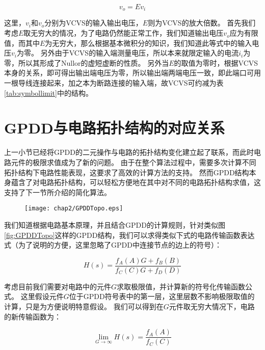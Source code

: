 \begin{equation}
v_o = E v_i
\end{equation}

这里，$v_i$和$v_o$分别为VCVS的输入输出电压，$E$则为VCVS的放大倍数。
首先我们考虑$E$取无穷大的情况，为了电路仍然能正常工作，我们知道输出电压$v_o$应为有限值，而其中$E$为无穷大，那么根据基本微积分的知识，我们知道此等式中的输入电压$v_i$为零。
另外由于VCVS的输入端测量电压，所以本来就限定输入的电流$i_i$为零，所以其形成了Nullor的虚短虚断的性质。
另外当$E$的取值为零时，根据VCVS本身的关系，即可得出输出端电压为零，所以输出端两端电压一致，即此端口可用一根导线连接起来，加之本为断路连接的输入端，故VCVS可约减为表\ref{tab:symbollimit}中的结构。

\section{GPDD与电路拓扑结构的对应关系}

上一小节已经将GPDD的二元操作与电路的拓扑结构变化建立起了联系，而此时电路元件的极限求值成为了新的问题。
由于在整个算法过程中，需要多次计算不同拓扑结构下电路性能表现，这要求了高效的计算方法的支持。
然而GPDD结构本身蕴含了对电路拓扑结构，可以轻松方便地在其中对不同的电路拓扑结构求值，这支持了下一节所介绍的简化算法。

\begin{figure}[!htp]
	\centering
	\texttt{[image: chap2/GPDDTopo.eps]}
\end{figure}

我们知道根据电路基本原理，并且结合GPDD的计算规则，针对类似图\ref{fig:GPDDTopo}这样的GPDD结构，我们可以求得类似下式的电路传输函数表达式（为了说明的方便，这里忽略了GPDD中连接节点的边上的符号）：

\begin{equation}
H \left( s \right) = \frac{{{f_A}\left( A \right)G + {f_B}\left( B \right)}}{{{f_C}\left( C \right)G + {f_D}\left( D \right)}}
\end{equation}

考虑目前我们需要对电路中的元件$G$求取极限值，并计算新的符号化传输函数公式。
这里假设元件$G$位于GPDD符号表中的第一层，这里层数不影响极限取值的计算，只是为方便说明特意假设。
我们可以得到在$G$元件取无穷大情况下，电路的新传输函数为：

\begin{equation}
\label{eq:simpGPDD}
\mathop {\lim }\limits_{G \to \infty } H \left( s \right) = \frac{{f_A}\left( A \right)}{{f_C}\left( C \right)}
\end{equation}

